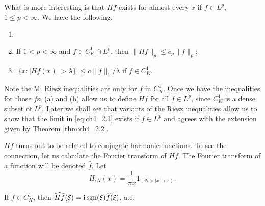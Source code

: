 What is more interesting is that $Hf$ exists for almost every $x$ if $f \in L^p$, $1 \leq p < \infty$. We have the following.

\begin{theorem}\label{thm:ch4_2.2}
\begin{enumerate}
    \item[]
    \item If $1 < p < \infty$ and $f \in C_K^1 \cap L^p$, then $\|Hf\|_p \leq c_p\|f\|_p$;
    \item $|\{x : |Hf(x)| > \lambda\}| \leq c\|f\|_1/\lambda$ if $f \in C_K^1$.
\end{enumerate}
\end{theorem}

Note the M. Riesz inequalities are only for $f$ in $C_K^1$. Once we have the inequalities for those $f$s, (a) and (b) allow us to define $Hf$ for all $f \in L^p$, since $C_K^1$ is a dense subset of $L^p$. Later we shall see that variants of the Riesz inequalities allow us to show that the limit in \eqref{eq:ch4_2.1} exists if $f \in L^p$ and agrees with the extension given by Theorem \ref{thm:ch4_2.2}.

$Hf$ turns out to be related to conjugate harmonic functions. To see the connection, let us calculate the Fourier transform of $Hf$. The Fourier transform of a function will be denoted $\widehat{f}$. Let
\begin{equation}\label{eq:ch4_2.2}
    H_{\epsilon N}(x) = \frac{1}{\pi x}1_{(N>|x|>\epsilon)}.
\end{equation}

\begin{proposition}\label{prop:ch4_2.3}
If $f \in C_K^1$, then $\widehat{Hf}(\xi) = \mathrm{i} \operatorname{sgn}(\xi)\widehat{f}(\xi)$, a.e.
\end{proposition}

